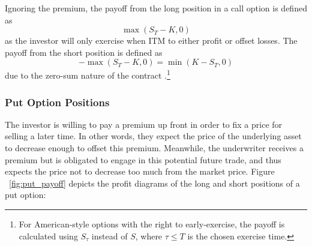 \documentclass[english,12pt,a4paper,pdftex,sci,utf8]{aaltothesis}
\begin{document}
Ignoring the premium, the payoff from the long position in a call option is defined as
\begin{equation}
    \max(S_T-K,0)
\end{equation}
as the investor will only exercise when ITM to either profit or offset losses. The payoff from the short position is defined as
\begin{equation}
    -\max(S_T-K,0) = \min(K-S_T,0)
\end{equation}
due to the zero-sum nature of the contract \cite[p. 9]{hull2016options}.\footnote{For American-style options with the right to early-exercise, the payoff is calculated using $S_\tau$ instead of $S$, where $\tau \le T$ is the chosen exercise time.}

\subsubsection{Put Option Positions}
The investor is willing to pay a premium up front in order to fix a price for selling a later time. In other words, they expect the price of the underlying asset to decrease enough to offset this premium. Meanwhile, the underwriter receives a premium but is obligated to engage in this potential future trade, and thus expects the price not to decrease too much from the market price. Figure ~\ref{fig:put_payoff} depicts the profit diagrams of the long and short positions of a put option:
\end{document}
